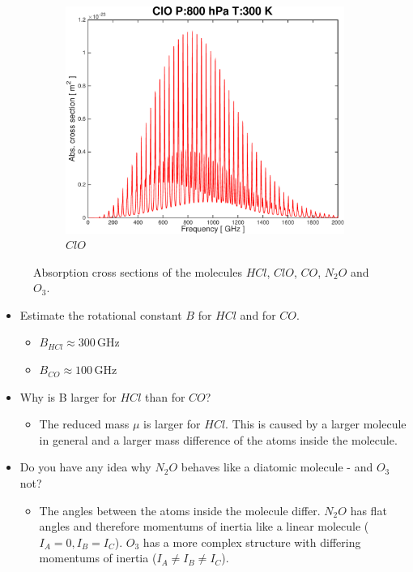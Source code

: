 \documentclass[paper=a4, fontsize=11pt]{scrartcl}
\begin{document}
\begin{figure}[t!]
\begin{subfigure}[b]{0.45\textwidth}
        \includegraphics[width=\textwidth]{plots/plot_xsec_ClO_800hPa_300K.pdf}
        \caption{$ClO$}
    \end{subfigure}

    \caption{Absorption cross sections of the molecules $HCl$, $ClO$, $CO$,
    $N_2O$ and $O_3$.}
    \label{fig:abs_molecules}
\end{figure}

\begin{itemize}
    \item Estimate the rotational constant $B$ for $HCl$ and for $CO$.
    \begin{itemize}
        \item $B_{HCl} \approx 300$\,GHz
        \item $B_{CO} \approx 100$\,GHz
    \end{itemize}
    \item Why is B larger for $HCl$ than for $CO$?
    \begin{itemize}
        \item The reduced mass $\mu$ is larger for $HCl$. This is caused by a
            larger molecule in general and a larger mass difference of the
            atoms inside the molecule.
    \end{itemize}
    \item Do you have any idea why $N_{2}O$ behaves like a diatomic molecule -
        and $O_{3}$ not?
    \begin{itemize}
        \item The angles between the atoms inside the molecule differ. $N_2O$
            has flat angles and therefore momentums of inertia like a linear
            molecule ($I_A = 0, I_B = I_C$). $O_3$ has a more complex structure
            with differing momentums of inertia ($I_A \neq I_B \neq I_C$).
    \end{itemize}
\end{itemize}
\end{document}
